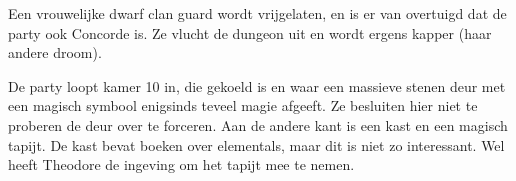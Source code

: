 Een vrouwelijke dwarf clan guard wordt vrijgelaten, en is er van overtuigd dat de party ook Concorde is. Ze vlucht de dungeon uit en wordt ergens kapper (haar andere droom).

De party loopt kamer 10 in, die gekoeld is en waar een massieve stenen deur met een magisch symbool enigsinds teveel magie afgeeft. Ze besluiten hier niet te proberen de deur over te forceren. Aan de andere kant is een kast en een magisch tapijt. De kast bevat boeken over elementals, maar dit is niet zo interessant. Wel heeft Theodore de ingeving om het tapijt mee te nemen.

